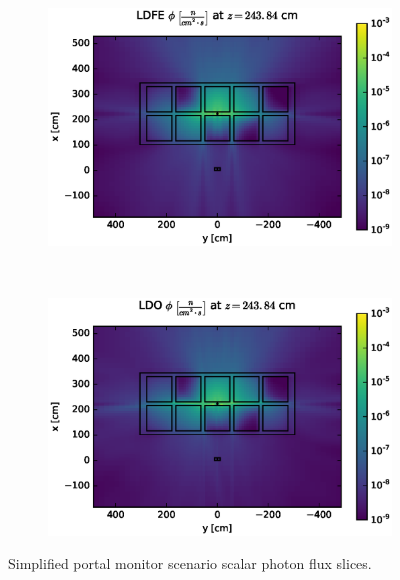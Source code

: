 \documentclass{article} %
\begin{document}
\begin{figure}[!htb]
\ContinuedFloat
\begin{subfigure}{\textwidth}
\centering
\includegraphics[max height=0.445\textheight]
{portal-fwd-flux-ldfe01.eps}
\end{subfigure}
\\
\begin{subfigure}{\textwidth}
\centering
\includegraphics[max height=0.445\textheight]
{portal-fwd-flux-ldo11.eps}
\end{subfigure}
\caption{Simplified portal monitor scenario scalar photon flux slices.}
\label{cargo-fwd-slices}
\end{figure}
\end{document}
